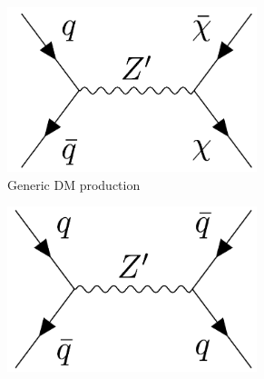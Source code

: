\begin{figure}[hp]
	\centering
\begin{subfigure}[t]{0.32\textwidth}
	\centering
	\includegraphics[width=0.8\textwidth]{Figures/2/FeyZprime.pdf}
%
%				
\caption{Generic DM production}
\label{fig:Feynman_Zprime_DM}
\end{subfigure}
\begin{subfigure}[t]{0.32\textwidth}
	\centering
	\includegraphics[width=0.8\textwidth]{Figures/2/FeyZprime_dijet.pdf}

\end{subfigure}
\end{figure}
